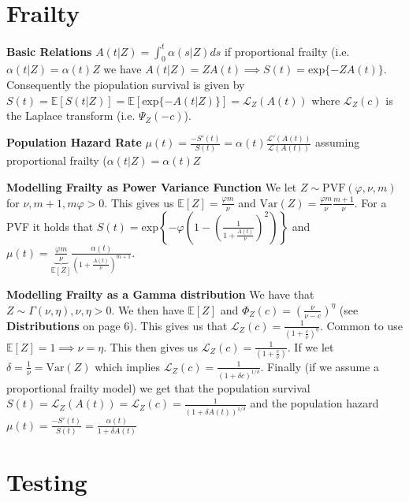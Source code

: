 \documentclass{article}
\begin{document}
\newpage

\section*{Frailty}

\textbf{Basic Relations}  $A(t|Z) = \int_0^t \alpha(s|Z)ds$ if proportional frailty (i.e. $\alpha(t|Z) = \alpha(t)Z$ we have $A(t|Z) = ZA(t) \implies S(t) = \text{exp}\{-ZA(t)\}$. Consequently the piopulation survival is given by $S(t) = \mathbb{E}[S(t|Z)] = \mathbb{E}\left[\text{exp}\{-A(t|Z)\}\right] = \mathcal{L}_Z(A(t))$ where $\mathcal{L}_Z(c)$ is the Laplace transform (i.e. $\Psi_Z(-c)$).

\medskip

\textbf{Population Hazard Rate} $\mu(t) = \frac{-S'(t)}{S(t)} = \alpha(t)\frac{\mathcal{L}'(A(t))}{\mathcal{L}(A(t))}$ assuming proportional frailty ($\alpha(t|Z) = \alpha(t)Z$

\medskip 

\textbf{Modelling Frailty as Power Variance Function} We let $Z \sim \text{PVF}(\varphi, \nu, m)$ for $\nu, m + 1, m\varphi > 0$. This gives us $\mathbb{E}[Z] = \frac{\varphi m}{\nu}$ and $\text{Var}(Z) = \frac{\varphi m}{\nu}\frac{m + 1}{\nu}$. For a PVF it holds that $S(t) = \text{exp}\left\{-\varphi\left(1- \left(\frac{1}{1 + \frac{A(t)}{\nu}}\right)^2\right)\right\}$ and $\mu(t) = \underbrace{\frac{\varphi m}{\nu}}_{\mathbb{E}[Z]}\frac{\alpha(t)}{\left(1+\frac{A(t)}{\nu}\right)^{m+1}}$. 

\textbf{Modelling Frailty as a Gamma distribution}
We have that $Z\sim \Gamma(\nu, \eta), \nu,\eta > 0$. We then have $\mathbb{E}[Z]$ and $\Phi_Z(c) = \left(\frac{\nu}{\nu-c}\right)^\eta$ (see \textbf{Distributions} on page 6). This gives us that $\mathcal{L}_Z(c) = \frac{1}{\left(1 + \frac{c}{\nu}\right)^\eta}$. Common to use $\mathbb{E}[Z] = 1 \implies \nu = \eta$. This then gives us $\mathcal{L}_Z(c) = \frac{1}{\left(1+\frac{c}{\nu}\right)}$. If we let $\delta = \frac{1}{\nu} = \text{Var}(Z)$ which implies $\mathcal{L}_Z(c) = \frac{1}{\left(1+\delta c\right)^{1/\delta}}$. Finally (if we assume a proportional frailty model) we get that the population survival $S(t) = \mathcal{L}_Z(A(t)) = \mathcal{L}_Z(c) = \frac{1}{\left(1+\delta A(t)\right)^{1/\delta}}$ and the population hazard $\mu(t) = \frac{-S'(t)}{S(t)} = \frac{\alpha(t)}{1 + \delta A(t)}$

\newpage

\section*{Testing}
\end{document}

